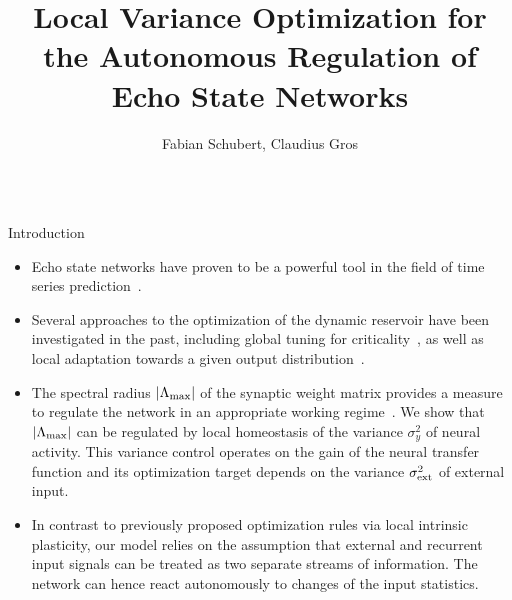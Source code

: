\documentclass{beamer}
\title{Local Variance Optimization for the Autonomous Regulation of Echo State Networks}
\author{Fabian Schubert, Claudius Gros}
\institute{Institute for Theoretical Physics, Goethe University Frankfurt a.M.}
\date{}
\begin{document}
\begin{frame}[t]
\begin{columns}[t]
\begin{column}{.4\textwidth}
\begin{myblock}{Introduction}
\begin{itemize}
	\item Echo state networks have proven to be a powerful tool in the field of time series prediction~\citep{Jaeger_2001}.
	\item Several approaches to the optimization of the dynamic reservoir have been investigated in the past, including global tuning for criticality~\cite{Livi_2016}, as well as local adaptation towards a given output distribution~\cite{Schrauwen_2008}.
	\item The spectral radius $|\Lambda_{\rm max}|$ of the synaptic weight matrix provides a measure to regulate the network in an appropriate working regime~\cite{Caluwaerts_2013}. We show that $|\Lambda_{\rm max}|$ can be regulated by local homeostasis of the variance $\sigma_y^2$ of neural activity. This variance control operates on the gain of the neural transfer function and its optimization target depends on the variance $\sigma_{\rm ext}^2$ of external input.
	\item In contrast to previously proposed optimization rules via local intrinsic plasticity, our model relies on the assumption that external and recurrent input signals can be treated as two separate streams of information. The network can hence react autonomously to changes of the input statistics.
\end{itemize}
\end{myblock}


\end{column}
\end{columns}
\end{frame}
\end{document}

